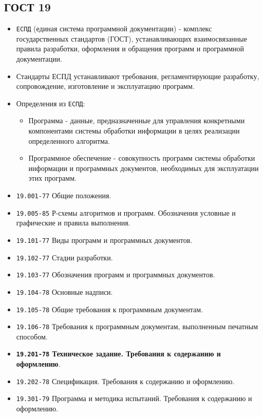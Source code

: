 \documentclass[a4paper, 14pt]{article}
\begin{document}
\subsection{ГОСТ 19}

\begin{itemize}
    \item \texttt{ЕСПД} (единая система программной документации) - комплекс государственных стандартов (ГОСТ), устанавливающих взаимосвязанные правила разработки, оформления и обращения программ и программной документации.
    \item Стандарты ЕСПД устанавливают требования, регламентирующие разработку, сопровождение, изготовление и эксплуатацию программ.
    \item Определения из \texttt{ЕСПД}:
    \begin{itemize}
        \item Программа - данные, предназначенные для управления конкретными компонентами системы обработки информации в целях реализации определенного алгоритма.
        \item Программное обеспечение - совокупность программ системы обработки информации и программных документов, необходимых для эксплуатации этих программ.
    \end{itemize}
    \item \texttt{19.001-77} Общие положения.
    \item \texttt{19.005-85} Р-схемы алгоритмов и программ. Обозначения условные и графические и правила выполнения.
    \item \texttt{19.101-77} Виды программ и программных документов.
    \item \texttt{19.102-77} Стадии разработки.
    \item \texttt{19.103-77} Обозначения программ и программных документов.
    \item \texttt{19.104-78} Основные надписи.
    \item \texttt{19.105-78} Общие требования к программным документам.
    \item \texttt{19.106-78} Требования к программным документам, выполненным печатным способом.
    \item \textbf{\texttt{19.201-78} Техническое задание. Требования к содержанию и оформлению}.
    \item \texttt{19.202-78} Спецификация. Требования к содержанию и оформлению.
    \item \texttt{19.301-79} Программа и методика испытаний. Требования к содержанию и оформлению.

\end{itemize}
\end{document}
